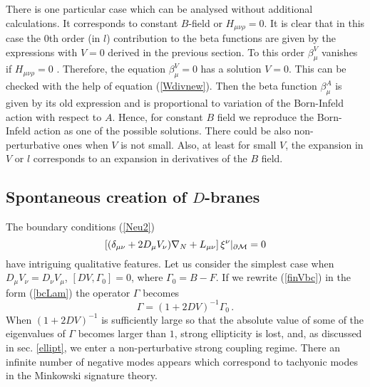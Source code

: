\documentclass[a4paper,12pt]{article}
\newcommand{\oB}{|_{\partial{\cal M}}}
\begin{document}
There is one particular case which can be analysed without
additional calculations. It corresponds to constant $B$-field or
$H_{\mu\nu\rho}=0$.
It is clear that in this case the $0$th order (in $l$) 
contribution to the beta functions are given by
the expressions with $V=0$ derived in the previous
section. To this order  
$\beta_\mu^V$ vanishes if $H_{\mu\nu\rho}=0$ . 
Therefore,
the equation $\beta_\mu^V=0$ has a solution $V=0$.
This can be checked with the help of equation (\ref{Wdivnew}).
Then the beta function $\beta_\mu^A$ is given by its
old expression and is proportional to variation
of the Born-Infeld action with respect to $A$.
Hence, for  constant $B$ field we reproduce the
Born-Infeld action as one of the possible solutions.
There could be also non-perturbative ones when $V$ is
not small. Also, at least for small $V$, the expansion
in $V$ or $l$ corresponds to an expansion in derivatives of
the $B$ field.



\subsection{Spontaneous creation of $D$-branes}\label{Dbranes}
The boundary
conditions (\ref{Neu2})
\begin{equation}
\left[ (\delta_{\mu\nu}+2D_\mu V_\nu )\nabla_N
 +L_{\mu\nu} \right]\xi^\nu \oB =0 \label{finVbc}
\end{equation}
have intriguing qualitative features. Let us consider the simplest case when
$D_\mu V_\nu =D_\nu V_\mu$, $[DV,\Gamma_0 ]=0$, where $\Gamma_0=B-F$.
If we rewrite  (\ref{finVbc}) in the form
(\ref{bcLam}) the operator $\Gamma$ becomes
\begin{equation}
\Gamma = (1+2DV )^{-1}\Gamma_0 \,. \label{Gam}
\end{equation}
When $(1+2DV)^{-1}$ is sufficiently large
so that the absolute value of some of the eigenvalues
of $\Gamma$ becomes larger than $1$, strong ellipticity
is lost, and, as discussed in sec. \ref{ellipt}, we
enter a non-perturbative strong coupling regime.
There an infinite number of negative modes
appears which correspond to tachyonic modes in
the Minkowski signature theory.
\end{document}
